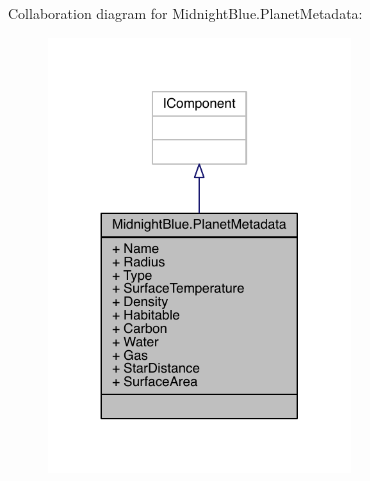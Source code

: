 Collaboration diagram for Midnight\+Blue.\+Planet\+Metadata\+:
\nopagebreak
\begin{figure}[H]
\begin{center}
\leavevmode
\includegraphics[width=227pt]{class_midnight_blue_1_1_planet_metadata__coll__graph}
\end{center}
\end{figure}
